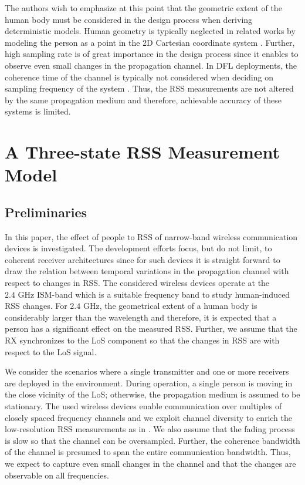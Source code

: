 \documentclass[journal, 10pt, twocolumn, balance]{IEEEtran}
\begin{document}
The authors wish to emphasize at this point that the geometric extent of the human body must be considered in the design process when deriving deterministic models. Human geometry is typically neglected in related works by modeling the person as a point in the 2D Cartesian coordinate system \cite{li2011,Zheng2012,Guo2013}. Further, high sampling rate is of great importance in the design process since it enables to observe even small changes in the propagation channel. In DFL deployments, the coherence time of the channel is  typically not considered when deciding on sampling frequency of the system \cite{Wilson2012, li2011, Kaltiokallio2012, Kaltiokallio2013}. Thus, the RSS measurements are not altered by the same propagation medium and therefore, achievable accuracy of these systems is limited.

\section{A Three-state RSS Measurement Model} \label{S:model}
\subsection{Preliminaries}

In this paper, the effect of people to RSS of narrow-band wireless communication devices is investigated. The development efforts focus, but do not limit, to coherent receiver architectures since for such devices it is straight forward to draw the relation between temporal variations in the propagation channel with respect to changes in RSS. The considered wireless devices operate at the $2.4 \text{ GHz}$ ISM-band which is a suitable frequency band to study human-induced RSS changes. For $2.4 \text{ GHz}$, the geometrical extent of a human body is considerably larger than the wavelength and therefore, it is expected that a person has a significant effect on the measured RSS. Further, we assume that the RX synchronizes to the LoS component so that the changes in RSS are with respect to the LoS signal.

We consider the scenarios where a single transmitter and one or more receivers are deployed in the environment. During operation, a single person is moving in the close vicinity of the LoS; otherwise, the propagation medium is assumed to be stationary. The used wireless devices enable communication over multiples of closely spaced frequency channels and we exploit channel diversity to enrich the low-resolution RSS measurements as in \cite{Kaltiokallio2012a}. We also assume that the fading process is slow so that the channel can be oversampled. Further, the coherence bandwidth of the channel is presumed to span the entire communication bandwidth. Thus, we expect to capture even small changes in the channel and that the changes are observable on all frequencies.
\end{document}

